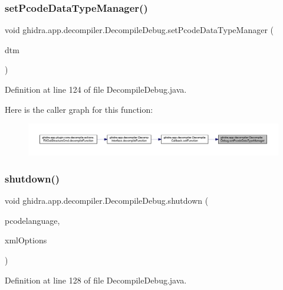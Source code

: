 \subsubsection{\texorpdfstring{setPcodeDataTypeManager()}{setPcodeDataTypeManager()}}
{\footnotesize\ttfamily void ghidra.\+app.\+decompiler.\+Decompile\+Debug.\+set\+Pcode\+Data\+Type\+Manager (\begin{DoxyParamCaption}\item[{Pcode\+Data\+Type\+Manager}]{dtm }\end{DoxyParamCaption})\hspace{0.3cm}{\ttfamily [inline]}}



Definition at line 124 of file Decompile\+Debug.\+java.

Here is the caller graph for this function\+:
\nopagebreak
\begin{figure}[H]
\begin{center}
\leavevmode
\includegraphics[width=350pt]{classghidra_1_1app_1_1decompiler_1_1_decompile_debug_a283a808d549422575132ef4e1aaafaea_icgraph}
\end{center}
\end{figure}
\mbox{\label{classghidra_1_1app_1_1decompiler_1_1_decompile_debug_a31d7bdb71f9cc5554a4c06d433e806d0}} 
\subsubsection{\texorpdfstring{shutdown()}{shutdown()}}
{\footnotesize\ttfamily void ghidra.\+app.\+decompiler.\+Decompile\+Debug.\+shutdown (\begin{DoxyParamCaption}\item[{Language}]{pcodelanguage,  }\item[{String}]{xml\+Options }\end{DoxyParamCaption})\hspace{0.3cm}{\ttfamily [inline]}}



Definition at line 128 of file Decompile\+Debug.\+java.

